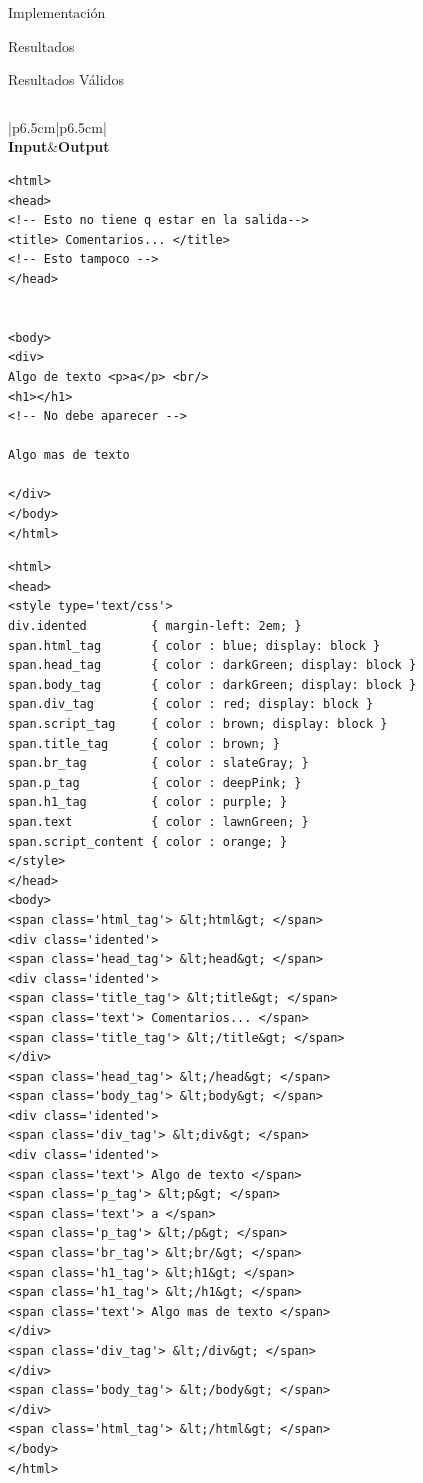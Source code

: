 \documentclass[a4paper,8pt]{article}
\begin{document}
\begin{section}{Implementación}
\begin{subsection}{Resultados}
\begin{subsubsection}{Resultados Válidos}
{\begin{verbatim}
\end{verbatim}}


\begin{tabular}{|p{6.5cm}|p{6.5cm}|}
\hline 
{}\\
\hline 
\textbf{Input}&\textbf{Output}\\
\hline
 \footnotesize{\begin{verbatim} 
<html>
<head>
<!-- Esto no tiene q estar en la salida-->
<title> Comentarios... </title>
<!-- Esto tampoco -->
</head>


<body>
<div>
Algo de texto <p>a</p> <br/>
<h1></h1>
<!-- No debe aparecer -->

Algo mas de texto

</div>
</body>
</html>
\end{verbatim}}  

\bigskip

\footnotesize{\begin{verbatim}
<html>
<head>
<style type='text/css'>
div.idented         { margin-left: 2em; }
span.html_tag       { color : blue; display: block }
span.head_tag       { color : darkGreen; display: block }
span.body_tag       { color : darkGreen; display: block }
span.div_tag        { color : red; display: block }
span.script_tag     { color : brown; display: block }
span.title_tag      { color : brown; }
span.br_tag         { color : slateGray; }
span.p_tag          { color : deepPink; }
span.h1_tag         { color : purple; }
span.text           { color : lawnGreen; }
span.script_content { color : orange; }
</style>
</head>
<body>
<span class='html_tag'> &lt;html&gt; </span>
<div class='idented'>
<span class='head_tag'> &lt;head&gt; </span>
<div class='idented'>
<span class='title_tag'> &lt;title&gt; </span>
<span class='text'> Comentarios... </span>
<span class='title_tag'> &lt;/title&gt; </span>
</div>
<span class='head_tag'> &lt;/head&gt; </span>
<span class='body_tag'> &lt;body&gt; </span>
<div class='idented'>
<span class='div_tag'> &lt;div&gt; </span>
<div class='idented'>
<span class='text'> Algo de texto </span>
<span class='p_tag'> &lt;p&gt; </span>
<span class='text'> a </span>
<span class='p_tag'> &lt;/p&gt; </span>
<span class='br_tag'> &lt;br/&gt; </span>
<span class='h1_tag'> &lt;h1&gt; </span>
<span class='h1_tag'> &lt;/h1&gt; </span>
<span class='text'> Algo mas de texto </span>
</div>
<span class='div_tag'> &lt;/div&gt; </span>
</div>
<span class='body_tag'> &lt;/body&gt; </span>
</div>
<span class='html_tag'> &lt;/html&gt; </span>
</body>
</html>
\end{verbatim}}\\
\hline
\end{tabular}



\end{subsubsection}
\end{subsection}
\end{section}
\end{document}
